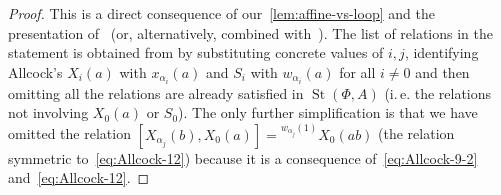\documentclass[oneside, 10pt]{amsart}
\DeclareMathOperator{\St}{St}
\numberwithin{equation}{section}
\numberwithin{thm}{section}
\numberwithin{lemma}{section}
\theoremstyle{definition}
\theoremstyle{remark}
\begin{document}
\begin{proof}
This is a direct consequence of our~\cref{lem:affine-vs-loop} and the presentation of~\cite[Theorem~1]{A16} (or, alternatively, \cite[Theorem~1.1]{A13} combined with~\cite[Theorem~1.3]{A13}).
The list of relations in the statement is obtained from \cite[Table~1]{A16} by substituting concrete values of $i, j$, identifying Allcock's $X_{i}(a)$ with
$x_{\alpha_i}(a)$ and $S_i$ with $w_{\alpha_i}(a)$ for all $i\neq 0$ and then omitting all the relations are already satisfied in $\St(\Phi, A)$ (i.\,e. the relations not involving $X_0(a)$ or $S_0$).
The only further simplification is that we have omitted the relation $[X_{\alpha_j}(b), X_0(a)] = {}^{w_{\alpha_j}(1)} X_0(ab)$ (the relation symmetric to~\eqref{eq:Allcock-12})
because it is a consequence of~\eqref{eq:Allcock-9-2} and~\eqref{eq:Allcock-12}.
\end{proof}
\end{document}
